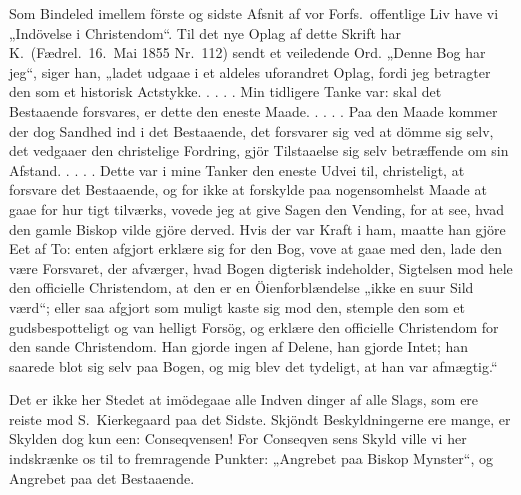 \documentclass[12pt,a4paper]{article}
\newcommand{\opage}[1]{\marginnote{\footnotesize\textit{[#1]}}}
\begin{document}
Som Bindeled imellem förste og sidste Afsnit af vor
Forfs.\ offentlige Liv have vi „Indövelse i Christendom“. Til
det nye Oplag af dette Skrift har K.\ (Fædrel.\ 16.\ Mai 1855
Nr.\ 112) sendt et veiledende Ord. „Denne Bog har jeg“,
siger han, „ladet udgaae i et aldeles uforandret Oplag, fordi
jeg betragter den som et historisk Actstykke. . . . . Min
tidligere Tanke var: skal det Bestaaende forsvares, er
dette den eneste Maade. . . . . Paa den Maade kommer
\opage{17} %
der dog Sandhed ind i det Bestaaende, det forsvarer
sig ved at dömme sig selv, det vedgaaer den christelige
Fordring, gjör Tilstaaelse sig selv betræffende om sin
Afstand. . . . . Dette var i mine Tanker den eneste Udvei
til, christeligt, at forsvare det Bestaaende, og for ikke
at forskylde paa nogensomhelst Maade at gaae for hur\-%
tigt tilværks, vovede jeg at give Sagen den Vending, for
at see, hvad den gamle Biskop vilde gjöre derved.
Hvis der var Kraft i ham, maatte han gjöre Eet af To:
enten afgjort erklære sig for den Bog, vove at gaae med
den, lade den være Forsvaret, der afværger, hvad Bogen
digterisk indeholder, Sigtelsen mod hele den officielle
Christendom, at den er en Öienforblændelse „ikke en
suur Sild værd“; eller saa afgjort som muligt kaste sig
mod den, stemple den som et gudsbespotteligt og van\-%
helligt Forsög, og erklære den officielle Christendom for
den sande Christendom. Han gjorde ingen af Delene,
han gjorde Intet; han saarede blot sig selv paa Bogen,
og mig blev det tydeligt, at han var afmægtig.“

Det er ikke her Stedet at imödegaae alle Indven\-%
dinger af alle Slags, som ere reiste mod S.\ Kierkegaard
paa det Sidste. Skjöndt Beskyldningerne ere mange, er
Skylden dog kun een: Conseqvensen! For Conseqven\-%
sens Skyld ville vi her indskrænke os til to fremragende
Punkter: „Angrebet paa Biskop Mynster“, og Angrebet
paa det Bestaaende.
\end{document}
